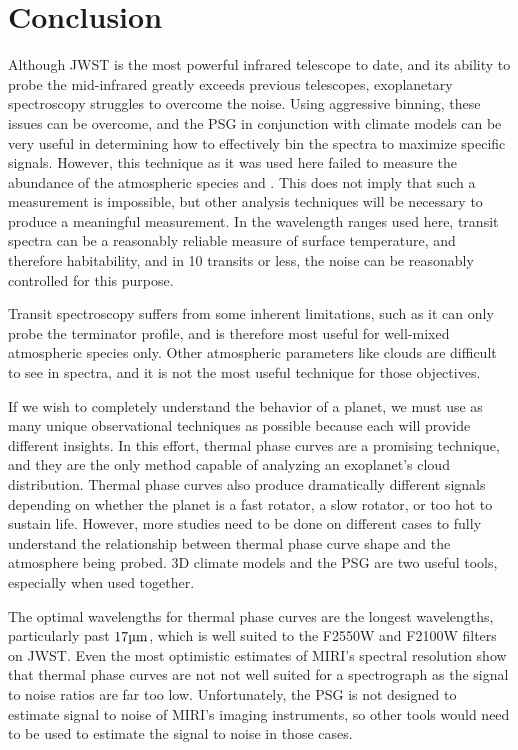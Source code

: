 \chapter{Conclusion}
\label{conclusion}
Although JWST is the most powerful infrared telescope to date, and its ability
 to probe the mid-infrared greatly exceeds previous telescopes, exoplanetary
 spectroscopy struggles to overcome the noise. Using aggressive binning, these
 issues can be overcome, and the PSG in conjunction with climate models can be
 very useful in determining how to effectively bin the spectra to maximize
 specific signals. However, this technique as it was used here failed to measure
 the abundance of the atmospheric species  and . This does
 not imply that such a measurement is impossible, but other analysis techniques
 will be necessary to produce a meaningful measurement. In the wavelength ranges
 used here, transit spectra can be a reasonably reliable measure of surface
 temperature, and therefore habitability, and in 10 transits or less, the noise
 can be reasonably controlled for this purpose.

Transit spectroscopy suffers from some inherent limitations, such as it can only
 probe the terminator profile, and is therefore most useful for well-mixed
 atmospheric species only. Other atmospheric parameters like clouds are
 difficult to see in spectra, and it is not the most useful technique for
 those objectives.

If we wish to completely understand the behavior of a planet, we must use as
 many unique observational techniques as possible because each will provide
 different insights. In this effort, thermal phase curves are a promising
 technique, and they are the only method capable of analyzing an exoplanet's
 cloud distribution. Thermal phase curves also produce dramatically different
 signals depending on whether the planet is a fast rotator, a slow rotator, or too
 hot to sustain life. However, more studies need to be done on different
 cases to fully understand the relationship between thermal phase curve
 shape and the atmosphere being probed. 3D climate models and the PSG are
 two useful tools, especially when used together.

The optimal wavelengths for thermal phase curves are the longest wavelengths,
 particularly past $17\si{\micro\meter}$, which is well suited to the F2550W and F2100W filters
 on JWST. Even the most optimistic estimates of MIRI's spectral resolution show
 that thermal phase curves are not not well suited for a spectrograph as the
 signal to noise ratios are far too low. Unfortunately, the PSG is not designed
 to estimate signal to noise of MIRI's imaging instruments, so other tools
 would need to be used to estimate the signal to noise in those cases.

